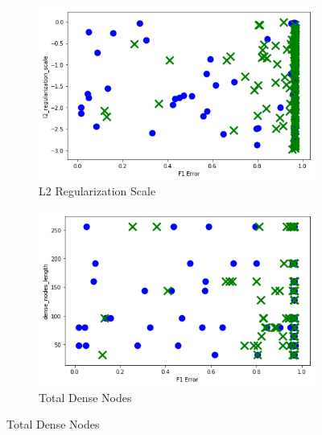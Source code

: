 \begin{figure}[H]
    \begin{subfigure}[b]{0.49\textwidth}
         \centering
         \includegraphics[width=\textwidth]{images/cnn_l2_reg_dummy.png}
         \caption{L2 Regularization Scale}
         \label{fig:cnn_L2_scale_learning}
     \end{subfigure}
     \hfill
     \begin{subfigure}[b]{0.49\textwidth}
         \centering
         \includegraphics[width=\textwidth]{images/cnn_dense_nodes_total_dummy.png}
         \caption{Total Dense Nodes}
         \label{fig:cnn_total_nodes_learning}
     \end{subfigure}  
     

\end{figure}
